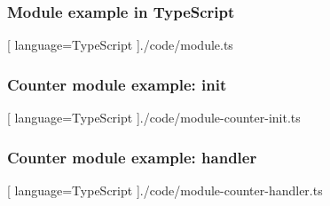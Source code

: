\begin{frame}
  \frametitle{Module example in TypeScript}
  \begin{center}
    
    [ language=TypeScript
    ]{./code/module.ts}
  \end{center}
\end{frame}

\begin{frame}
  \frametitle{Counter module example: init}
  \begin{center}
    
    [ language=TypeScript
    ]{./code/module-counter-init.ts}
  \end{center}
\end{frame}

\begin{frame}
  \frametitle{Counter module example: handler}
  \begin{center}
    
    [ language=TypeScript
    ]{./code/module-counter-handler.ts}
  \end{center}
\end{frame}